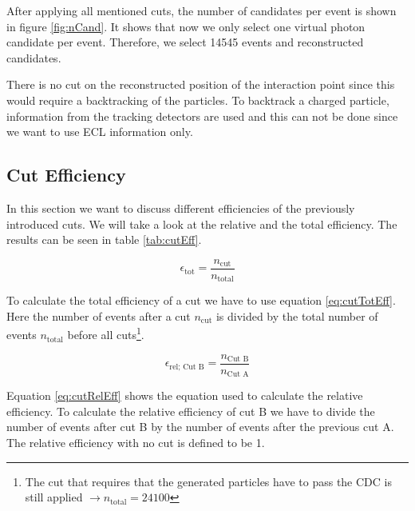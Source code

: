 \documentclass[a4paper,11pt,twosided,final,german,openbib,pdftex,listof=totoc,bibliography=totoc]{scrbook}
\begin{document}
After applying all mentioned cuts, the number of candidates per event is shown in figure \ref{fig:nCand}. It shows that now we only select one virtual photon candidate per event. Therefore, we select 14545 events and reconstructed candidates.
\newline

There is no cut on the reconstructed position of the interaction point since this would require a backtracking of the particles. To backtrack a charged particle, information from the tracking detectors are used and this can not be done since we want to use ECL information only.




\subsection{Cut Efficiency}

In this section we want to discuss different efficiencies of the previously introduced cuts. We will take a look at the relative and the total efficiency. The results can be seen in table \ref{tab:cutEff}.

\begin{equation}
	\epsilon_{\textrm{tot}} = \frac{n_{\textrm{cut}}}{n_{\textrm{total}}}
	\label{eq:cutTotEff}
\end{equation}

To calculate the total efficiency of a cut we have to use equation \ref{eq:cutTotEff}. Here the number of events after a cut $n_{\textrm{cut}}$ is divided by the total number of events $n_{\textrm{total}}$ before all cuts\footnote{The cut that requires that the generated particles have to pass the CDC is still applied $\rightarrow n_{\textrm{total}} = 24100$}.

\begin{equation}
	\epsilon_{\textrm{rel; Cut B}} = \frac{n_{\textrm{Cut B}}}{n_{\textrm{Cut A}}}
	\label{eq:cutRelEff}
\end{equation}

Equation \ref{eq:cutRelEff} shows the equation used to calculate the relative efficiency. To calculate the relative efficiency of cut B we have to divide the number of events after cut B by the number of events after the previous
cut A. The relative efficiency with no cut is defined to be 1.
\end{document}
